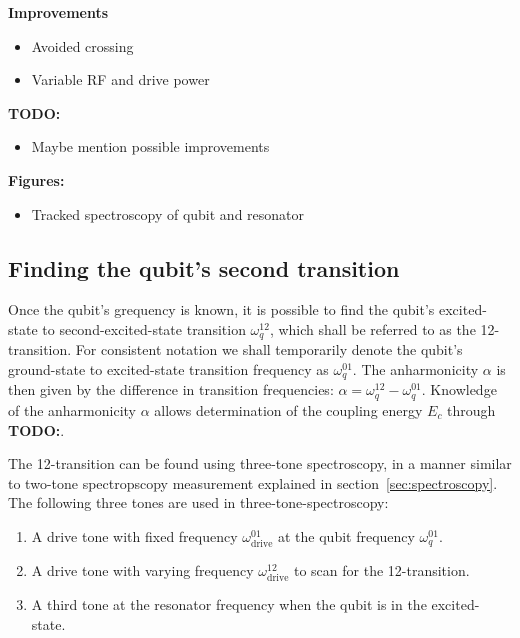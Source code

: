         \textbf{Improvements}
        \begin{itemize}
          \item Avoided crossing
          \item Variable RF and drive power
        \end{itemize}
        \textbf{TODO:}
        \begin{itemize}
          \item Maybe mention possible improvements
        \end{itemize}
        \textbf{Figures:}
        \begin{itemize}
          \item Tracked spectroscopy of qubit and resonator
        \end{itemize}

      \subsection{Finding the qubit's second transition}
        \label{ssec:12-transition spectroscopy}
        Once the qubit's grequency is known, it is possible to find the qubit's excited-state to second-excited-state transition $\omega_q^{12}$, which shall be referred to as the 12-transition. For consistent notation we shall temporarily denote the qubit's ground-state to excited-state transition frequency as $\omega_q^{01}$. The anharmonicity $\alpha$ is then given by the difference in transition frequencies: $\alpha = \omega_q^{12} - \omega_q^{01}$. Knowledge of the anharmonicity $\alpha$ allows determination of the coupling energy $E_c$ through \textbf{TODO:}.

        The 12-transition can be found using three-tone spectroscopy, in a manner similar to two-tone spectropscopy measurement explained in section~\ref{sec:spectroscopy}. The following three tones are used in three-tone-spectroscopy:

        \begin{enumerate}
          \item A drive tone with fixed frequency $\omega_\text{drive}^{01}$ at the qubit frequency $\omega_q^{01}$.
          \item A drive tone with varying frequency $\omega_\text{drive}^{12}$ to scan for the 12-transition.
          \item A third tone at the resonator frequency when the qubit is in the excited-state.
        \end{enumerate}

